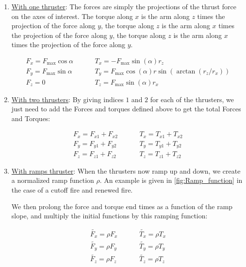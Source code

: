 \documentclass[]{BasiliskReportMemo}
\begin{document}
\begin{enumerate}
\item{\underline{With one thruster}}: The forces are simply the projections of the thrust force on the axes of interest. The torque along $x$ is the arm along $z$ times the projection of the force along $y$, the torque along $z$ is the arm along $x$ times the projection of the force along $y$, the torque along $z$ is the arm along $x$ times the projection of the force along $y$. 

\begin{align}
F_x =F_{\mathrm{max}} \cos \alpha &\hspace{1cm} T_x = - F_{\mathrm{max}}\sin(\alpha) r_z \\ 
F_y = F_{\mathrm{max}} \sin \alpha &\hspace{1cm} T_y = F_{\mathrm{max}} \cos(\alpha) r \sin( \arctan(r_z/r_x)) \\ 
F_z = 0 &\hspace{1cm} T_z =  F_{\mathrm{max}} \sin(\alpha) r_x 
\end{align}


\item{\underline{With two thrusters}}: By giving indices $1$ and $2$ for each of the thrusters, we just need to add the Forces and torques defined above to get the total Forces and Torques:

\begin{align}
F_x = F_{x1} + F_{x2} &\hspace{1cm} T_x = T_{x1} + T_{x2} \\ 
F_y =  F_{y1} + F_{y2} &\hspace{1cm} T_y =  T_{y1} + T_{y2}\\ 
F_z =  F_{z1} + F_{z2} &\hspace{1cm} T_z =  T_{z1} + T_{z2}
\end{align}

\item{\underline{With ramps thruster}}: When the thrusters now ramp up and down, we create a normalized ramp function $\rho$. An example is given in \ref{fig:Ramp_function} in the case of a cutoff fire and renewed fire. \par

 

We then prolong the force and torque end times as a function of the ramp slope, and multiply the initial functions by this ramping function:

\begin{align}
\tilde{F_x} = \rho F_{x} &\hspace{1cm} \tilde{T_x} =\rho T_{x}  \\ 
\tilde{F_y} =  \rho F_{y}  &\hspace{1cm} \tilde{T_y} =\rho  T_{y} \\ 
\tilde{F_z} = \rho F_{z} &\hspace{1cm} \tilde{T_z} =\rho  T_{z} 
\end{align}

\end{enumerate}
\end{document}
